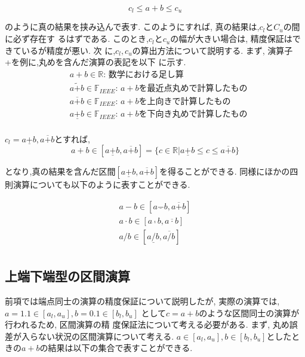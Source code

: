\documentclass[11pt,a4paper]{jsreport}
\theoremstyle{definition}
\begin{document}
\begin{equation*}
 c_l \leq a + b \leq c_u
\end{equation*}

\noindent のように真の結果を挟み込んで表す. このようにすれば, 真の結果は,$c_l$と$C_u$の間に必ず存在す
るはずである. このとき,$c_l$と$c_u$の幅が大きい場合は, 精度保証はできているが精度が悪い. 次
に,$c_l,c_u$の算出方法について説明する. まず, 演算子+を例に,丸めを含んだ演算の表記を以下
に示す.
\\

\begin{align*}
 & a + b \in \mathbb{R}\text{: 数学における足し算} \\
 & a \tilde{+} b \in \mathbb{F}_{IEEE}\text{: $a + b$を最近点丸めで計算したもの} \\
 & a \overline{+} b \in \mathbb{F}_{IEEE}\text{: $a + b$を上向きで計算したもの} \\
 & a \underline{+} b \in \mathbb{F}_{IEEE}\text{: $a + b$を下向き丸めで計算したもの} \\
\end{align*}

$c_l = a \underline{+} b,a \overline{+} b$とすれば, \\

\begin{equation*}
 a + b \in [a \underline{+} b,a \overline{+} b] = \{c \in \mathbb{R} | a \underline{+} b \leq c \leq a \overline{+} b\}
\end{equation*}

となり,真の結果を含んだ区間$[a \underline{+} b,a \overline{+}  b]$を得ることができる. 同様にほかの四則演算についても以下のように表すことができる.

\begin{align*}
a - b \in [a \underline{-} b,a \overline{+} b]  \\
a \cdot b \in [a \underline{\cdot} b,a \overline{\cdot} b] \\
a / b \in [a \underline{/} b,a \overline{/} b] \\
\end{align*}
\subsection{上端下端型の区間演算}
  前項では端点同士の演算の精度保証について説明したが, 実際の演算では, $a = 1.1 \in [a_l,a_u],b = 0.1 \in [b_l,b_u]$
として$c = a + b$のような区間同士の演算が行われるため, 区間演算の精
度保証法について考える必要がある. まず, 丸め誤差が入らない状況の区間演算について考える. 
$a \in [a_l,a_u],b \in [b_l,b_u]$としたときの$a + b$の結果は以下の集合で表すことができる.
\end{document}
